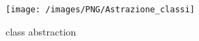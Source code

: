 

\blindtext
\begin{figure}[h]
\begin{center}
\texttt{[image: /images/PNG/Astrazione\_classi]}
\caption{class abstraction}
\label{fig:classAbstraction}
\end{center}
\end{figure}

\blindtext

